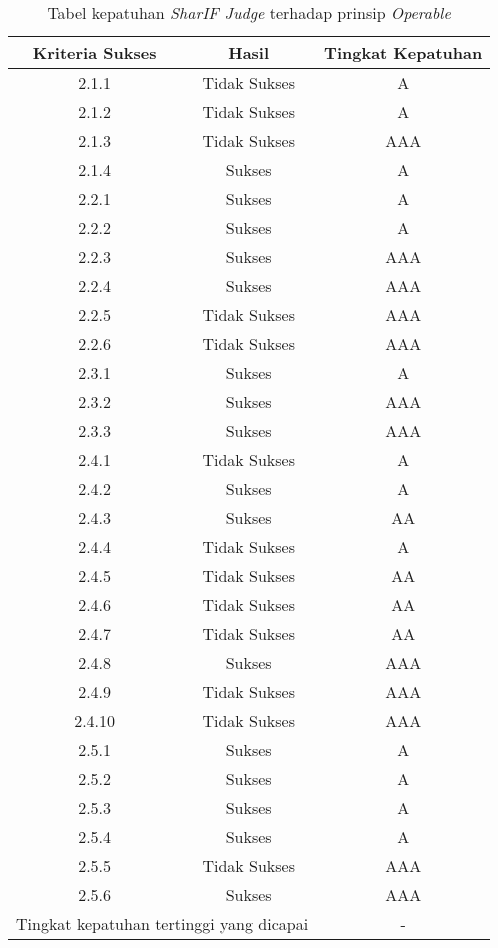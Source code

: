\begin{table}[H]
	\centering
	\caption{Tabel kepatuhan \textit{SharIF Judge} terhadap prinsip \textit{Operable}}
	\label{tab:kepatuhan_sharif_judge_operable}
	\begin{tabular}{|c|c|c|}
		\hline
		Kriteria Sukses & Hasil & Tingkat Kepatuhan \\
		\hline
		\rowcolor{Pink} 2.1.1 & Tidak Sukses & A\\
		\rowcolor{Pink} 2.1.2 & Tidak Sukses & A\\
		\rowcolor{Red} 2.1.3 & Tidak Sukses & AAA\\
		2.1.4 & Sukses & A\\
		2.2.1 & Sukses & A\\
		2.2.2 & Sukses & A\\
		2.2.3 & Sukses & AAA\\
		2.2.4 & Sukses & AAA\\
		\rowcolor{Red} 2.2.5 & Tidak Sukses & AAA\\
		\rowcolor{Red} 2.2.6 & Tidak Sukses & AAA\\
		2.3.1 & Sukses & A\\
		2.3.2 & Sukses & AAA\\
		2.3.3 & Sukses & AAA\\
		\rowcolor{Pink} 2.4.1 & Tidak Sukses & A\\
		2.4.2 & Sukses & A\\
		2.4.3 & Sukses & AA\\
		\rowcolor{Pink} 2.4.4 & Tidak Sukses & A\\
		\rowcolor{LightRed} 2.4.5 & Tidak Sukses & AA\\
		\rowcolor{LightRed} 2.4.6 & Tidak Sukses & AA\\
		\rowcolor{LightRed} 2.4.7 & Tidak Sukses & AA\\
		2.4.8 & Sukses & AAA\\
		\rowcolor{Red} 2.4.9 & Tidak Sukses & AAA\\
		\rowcolor{Red} 2.4.10 & Tidak Sukses & AAA\\
		2.5.1 & Sukses & A\\
		2.5.2 & Sukses & A\\
		2.5.3 & Sukses & A\\
		2.5.4 & Sukses & A\\
		\rowcolor{Red} 2.5.5 & Tidak Sukses & AAA\\
		2.5.6 & Sukses & AAA\\
		\hline
		\multicolumn{2}{|c|}{Tingkat kepatuhan tertinggi yang dicapai} & - \\
		\hline
	\end{tabular}
\end{table}

